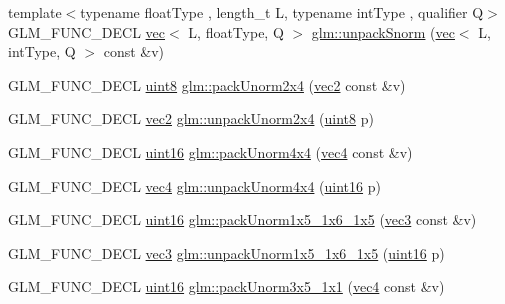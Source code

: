 \begin{DoxyCompactItemize}
\item 
{\footnotesize template$<$typename float\+Type , length\+\_\+t L, typename int\+Type , qualifier Q$>$ }\\G\+L\+M\+\_\+\+F\+U\+N\+C\+\_\+\+D\+E\+CL \hyperlink{structglm_1_1vec}{vec}$<$ L, float\+Type, Q $>$ \hyperlink{group__gtc__packing_ga6d49b31e5c3f9df8e1f99ab62b999482}{glm\+::unpack\+Snorm} (\hyperlink{structglm_1_1vec}{vec}$<$ L, int\+Type, Q $>$ const \&v)
\item 
G\+L\+M\+\_\+\+F\+U\+N\+C\+\_\+\+D\+E\+CL \hyperlink{group__gtc__type__precision_ga1a7dcd8aac97cc8020817c94049deff2}{uint8} \hyperlink{group__gtc__packing_gad68eb2f848ba867192b8787998c0595a}{glm\+::pack\+Unorm2x4} (\hyperlink{group__core__types_gaa1618f51db67eaa145db101d8c8431d8}{vec2} const \&v)
\item 
G\+L\+M\+\_\+\+F\+U\+N\+C\+\_\+\+D\+E\+CL \hyperlink{group__core__types_gaa1618f51db67eaa145db101d8c8431d8}{vec2} \hyperlink{group__gtc__packing_ga3afb0452954320f2d83fe6f38cb24147}{glm\+::unpack\+Unorm2x4} (\hyperlink{group__gtc__type__precision_ga1a7dcd8aac97cc8020817c94049deff2}{uint8} p)
\item 
G\+L\+M\+\_\+\+F\+U\+N\+C\+\_\+\+D\+E\+CL \hyperlink{group__gtc__type__precision_gad8c2939e1fdd8e5828b31d95c52255d5}{uint16} \hyperlink{group__gtc__packing_gad493c9f130e91dd8a4b360b05dcea573}{glm\+::pack\+Unorm4x4} (\hyperlink{group__core__types_ga5881b1b022d7fd1b7218f5916532dd02}{vec4} const \&v)
\item 
G\+L\+M\+\_\+\+F\+U\+N\+C\+\_\+\+D\+E\+CL \hyperlink{group__core__types_ga5881b1b022d7fd1b7218f5916532dd02}{vec4} \hyperlink{group__gtc__packing_ga38a0a518d53e15a9481c31dc1e574a40}{glm\+::unpack\+Unorm4x4} (\hyperlink{group__gtc__type__precision_gad8c2939e1fdd8e5828b31d95c52255d5}{uint16} p)
\item 
G\+L\+M\+\_\+\+F\+U\+N\+C\+\_\+\+D\+E\+CL \hyperlink{group__gtc__type__precision_gad8c2939e1fdd8e5828b31d95c52255d5}{uint16} \hyperlink{group__gtc__packing_ga0fcb493167d540aca105d11df5c55503}{glm\+::pack\+Unorm1x5\+\_\+1x6\+\_\+1x5} (\hyperlink{group__core__types_ga1c47e8b3386109bc992b6c48e91b0be7}{vec3} const \&v)
\item 
G\+L\+M\+\_\+\+F\+U\+N\+C\+\_\+\+D\+E\+CL \hyperlink{group__core__types_ga1c47e8b3386109bc992b6c48e91b0be7}{vec3} \hyperlink{group__gtc__packing_ga6804d0525daf68bcac226f46fbb3b24e}{glm\+::unpack\+Unorm1x5\+\_\+1x6\+\_\+1x5} (\hyperlink{group__gtc__type__precision_gad8c2939e1fdd8e5828b31d95c52255d5}{uint16} p)
\item 
G\+L\+M\+\_\+\+F\+U\+N\+C\+\_\+\+D\+E\+CL \hyperlink{group__gtc__type__precision_gad8c2939e1fdd8e5828b31d95c52255d5}{uint16} \hyperlink{group__gtc__packing_ga1b41375846ed66768da78ca299d8d010}{glm\+::pack\+Unorm3x5\+\_\+1x1} (\hyperlink{group__core__types_ga5881b1b022d7fd1b7218f5916532dd02}{vec4} const \&v)

\end{DoxyCompactItemize}

